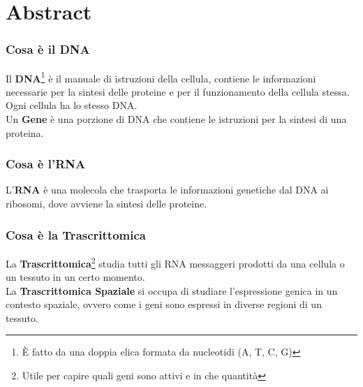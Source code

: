 \chapter*{Abstract}
\label{chap:abstract}
\subsection*{Cosa è il DNA}

Il \textbf{DNA}\footnote{È fatto da una doppia elica formata da nucleotidi (A, T, C, G)} è il manuale di istruzioni della cellula, contiene le informazioni necessarie per la sintesi delle proteine e per il funzionamento della cellula stessa.
Ogni cellula ha lo stesso DNA.\\
Un \textbf{Gene} è una porzione di DNA che contiene le istruzioni per la sintesi di una proteina.\\

\subsection*{Cosa è l'RNA}
L'\textbf{RNA} è una molecola che trasporta le informazioni genetiche dal DNA ai ribosomi, dove avviene la sintesi delle proteine.\\

\subsection*{Cosa è la Trascrittomica}
La \textbf{Trascrittomica}\footnote{Utile per capire quali geni sono attivi e in che quantità} studia tutti gli RNA messaggeri prodotti da una cellula o un tessuto in un certo momento.\\
La \textbf{Trascrittomica Spaziale} si occupa di studiare l'espressione genica in un contesto spaziale, ovvero come i geni sono espressi in diverse regioni di un tessuto.\\